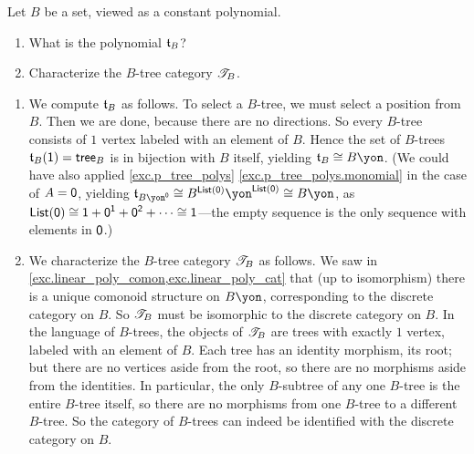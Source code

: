 \documentclass[Book-Poly]{subfiles}
\begin{document}
\begin{exercise}
Let $B$ be a set, viewed as a constant polynomial.
\begin{enumerate}
	\item What is the polynomial $\mathfrak{t}_B$? 
	\item Characterize the $B$-tree category $\mathscr{T}_{B}$.
\qedhere
\end{enumerate}
\begin{solution}
\begin{enumerate}
    \item We compute $\mathfrak{t}_B$ as follows.
    To select a $B$-tree, we must select a position from $B$.
    Then we are done, because there are no directions.
    So every $B$-tree consists of $1$ vertex labeled with an element of $B$.
    Hence the set of $B$-trees $\mathfrak{t}_B(\textsf{1})=\mathsf{tree}_B$ is in bijection with $B$ itself, yielding $\ema{t}_B\iso B\yon$.
    (We could have also applied \cref{exc.p_tree_polys} \cref{exc.p_tree_polys.monomial} in the case of $A=\textsf{0}$, yielding $\ema{t}_{B\yon^\0}\iso B^{\lst(\0)}\yon^{\lst(\0)}\iso B\yon$, as $\mathsf{List}(\textsf{0})\cong\textsf{1}+\textsf{0}^{\textsf{1}}+\textsf{0}^{\textsf{2}}+\cdots\cong\textsf{1}$---the empty sequence is the only sequence with elements in $\textsf{0}$.)
    \item We characterize the $B$-tree category $\mathscr{T}_{B}$ as follows.
    We saw in \cref{exc.linear_poly_comon,exc.linear_poly_cat} that (up to isomorphism) there is a unique comonoid structure on $B\yon$, corresponding to the discrete category on $B$.
    So $\mathscr{T}_{B}$ must be isomorphic to the discrete category on $B$.
    In the language of $B$-trees, the objects of $\mathscr{T}_{B}$ are trees with exactly $1$ vertex, labeled with an element of $B$.
    Each tree has an identity morphism, its root; but there are no vertices aside from the root, so there are no morphisms aside from the identities.
    In particular, the only $B$-subtree of any one $B$-tree is the entire $B$-tree itself, so there are no morphisms from one $B$-tree to a different $B$-tree.
    So the category of $B$-trees can indeed be identified with the discrete category on $B$.
\end{enumerate}
\end{solution}
\end{exercise}
\end{document}
